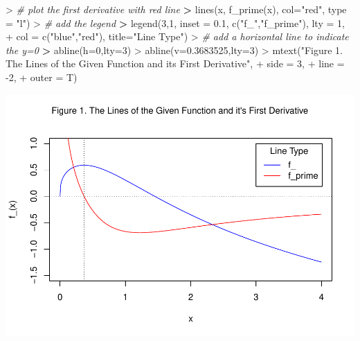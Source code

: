 \documentclass[
]{article}
\newenvironment{Shaded}{\begin{snugshade}}{\end{snugshade}}
\newcommand{\AttributeTok}[1]{\textcolor[rgb]{0.77,0.63,0.00}{#1}}
\newcommand{\CommentTok}[1]{\textcolor[rgb]{0.56,0.35,0.01}{\textit{#1}}}
\newcommand{\DecValTok}[1]{\textcolor[rgb]{0.00,0.00,0.81}{#1}}
\newcommand{\ErrorTok}[1]{\textcolor[rgb]{0.64,0.00,0.00}{\textbf{#1}}}
\newcommand{\FloatTok}[1]{\textcolor[rgb]{0.00,0.00,0.81}{#1}}
\newcommand{\FunctionTok}[1]{\textcolor[rgb]{0.00,0.00,0.00}{#1}}
\newcommand{\NormalTok}[1]{#1}
\newcommand{\SpecialCharTok}[1]{\textcolor[rgb]{0.00,0.00,0.00}{#1}}
\newcommand{\StringTok}[1]{\textcolor[rgb]{0.31,0.60,0.02}{#1}}
\begin{document}
\begin{Shaded}
\begin{Highlighting}[]
\SpecialCharTok{\textgreater{}} \CommentTok{\# plot the first derivative with red line}
\ErrorTok{\textgreater{}} \FunctionTok{lines}\NormalTok{(x, }\FunctionTok{f\_prime}\NormalTok{(x), }\AttributeTok{col=}\StringTok{"red"}\NormalTok{, }\AttributeTok{type =} \StringTok{"l"}\NormalTok{)}
\SpecialCharTok{\textgreater{}} \CommentTok{\# add the legend}
\ErrorTok{\textgreater{}} \FunctionTok{legend}\NormalTok{(}\DecValTok{3}\NormalTok{,}\DecValTok{1}\NormalTok{, }\AttributeTok{inset =} \FloatTok{0.1}\NormalTok{, }\FunctionTok{c}\NormalTok{(}\StringTok{"f\_"}\NormalTok{,}\StringTok{"f\_prime"}\NormalTok{), }\AttributeTok{lty =} \DecValTok{1}\NormalTok{, }
\SpecialCharTok{+}        \AttributeTok{col =} \FunctionTok{c}\NormalTok{(}\StringTok{"blue"}\NormalTok{,}\StringTok{"red"}\NormalTok{), }\AttributeTok{title=}\StringTok{"Line Type"}\NormalTok{)}
\SpecialCharTok{\textgreater{}} \CommentTok{\# add a horizontal line to indicate the y=0}
\ErrorTok{\textgreater{}} \FunctionTok{abline}\NormalTok{(}\AttributeTok{h=}\DecValTok{0}\NormalTok{,}\AttributeTok{lty=}\DecValTok{3}\NormalTok{)}
\SpecialCharTok{\textgreater{}} \FunctionTok{abline}\NormalTok{(}\AttributeTok{v=}\FloatTok{0.3683525}\NormalTok{,}\AttributeTok{lty=}\DecValTok{3}\NormalTok{)}
\SpecialCharTok{\textgreater{}} \FunctionTok{mtext}\NormalTok{(}\StringTok{"Figure 1. The Lines of the Given Function and it\textquotesingle{}s First Derivative"}\NormalTok{,}
\SpecialCharTok{+}       \AttributeTok{side =} \DecValTok{3}\NormalTok{,}
\SpecialCharTok{+}       \AttributeTok{line =} \SpecialCharTok{{-}}\DecValTok{2}\NormalTok{,}
\SpecialCharTok{+}       \AttributeTok{outer =}\NormalTok{ T)}
\end{Highlighting}
\end{Shaded}

\includegraphics{Homework_05_Pan-Lei_files/figure-latex/unnamed-chunk-2-1.pdf}
\end{document}
